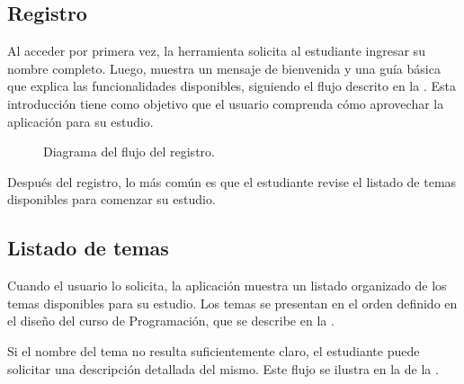 \subsection{Registro}

Al acceder por primera vez, la herramienta solicita al estudiante ingresar su nombre completo. Luego, muestra un mensaje de bienvenida y una guía básica que explica las funcionalidades disponibles, siguiendo el flujo descrito en la . Esta introducción tiene como objetivo que el usuario comprenda cómo aprovechar la aplicación para su estudio.

\begin{figure}[h!]
  \centering
  \caption{Diagrama del flujo del registro.}\label{fig:register}
\end{figure}

Después del registro, lo más común es que el estudiante revise el listado de temas disponibles para comenzar su estudio.

\subsection{Listado de temas}

Cuando el usuario lo solicita, la aplicación muestra un listado organizado de los temas disponibles para su estudio. Los temas se presentan en el orden definido en el diseño del curso de Programación, que se describe en la .

Si el nombre del tema no resulta suficientemente claro, el estudiante puede solicitar una descripción detallada del mismo. Este flujo se ilustra en la  de la .

